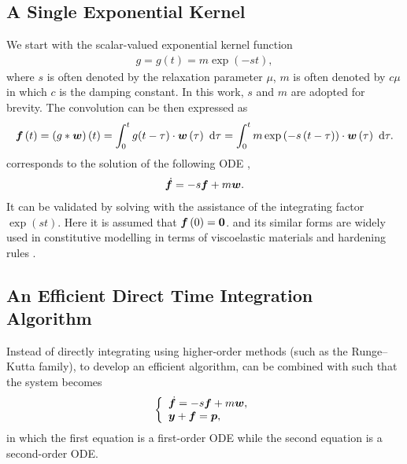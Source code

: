 \subsection{A Single Exponential Kernel}
We start with the scalar-valued exponential kernel function
\begin{gather}
g=g\left(t\right)=m\exp\left(-st\right),
\end{gather}
where $s$ is often denoted by the relaxation parameter $\mu$, $m$ is often denoted by $c\mu$ in which $c$ is the damping constant. In this work, $s$ and $m$ are adopted for brevity.
The convolution can be then expressed as
\begin{gather}\label{eq:single_conv}
\bm{f}\left(t\right)=\left(g*\bm{w}\right)\left(t\right)=\int_0^tg(t-\tau)\cdot\bm{w}\left(\tau\right)~\mathrm{d}\tau=\int_0^tm\exp\left(-s\left(t-\tau\right)\right)\cdot\bm{w}\left(\tau\right)~\mathrm{d}\tau.
\end{gather}
 corresponds to the solution of the following ODE \citep[see, e.g.,][\S~80]{Zwillinger2021},
\begin{gather}\label{eq:single_conv_ode}
\dot{\bm{f}}=-s\bm{f}+m\bm{w}.
\end{gather}
It can be validated by solving  with the assistance of the integrating factor $\exp\left(st\right)$. Here it is assumed that $\bm{f}\left(0\right)=\bm{0}$.  and its similar forms are widely used in constitutive modelling in terms of viscoelastic materials \citep[e.g.,][]{Muravyov1998} and hardening rules \citep[e.g.,][]{Chaboche1989}.
\subsection{An Efficient Direct Time Integration Algorithm}
Instead of directly integrating  using higher-order methods (such as the Runge--Kutta family), to develop an efficient algorithm,  can be combined with  such that the system becomes
\begin{gather}\label{eq:eqv_sys}
\left\{
\begin{array}{l}
\dot{\bm{f}}=-s\bm{f}+m\bm{w},\\
\bm{y}+\bm{f}=\bm{p},
\end{array}\right.
\end{gather}
in which the first equation is a first-order ODE while the second equation is a second-order ODE.

